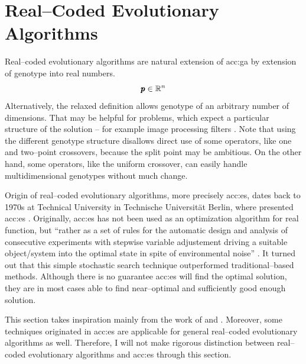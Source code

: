 \section{Real--Coded Evolutionary Algorithms}

Real--coded evolutionary algorithms are natural extension of \acrshort{acc:ga} by extension of genotype into real numbers.
$$
\pmb{p} \in \mathbb{R}^{n}
$$
Alternatively, the relaxed definition allows genotype of an arbitrary number of dimensions. That may be helpful for problems, which expect a particular structure of the solution -- for example image processing filters \citep{WVDF}. Note that using the different genotype structure disallows direct use of some operators, like one and two--point crossovers, because the split point may be ambitious. On the other hand, some operators, like the uniform crossover, can easily handle multidimensional genotypes without much change.

Origin of real--coded evolutionary algorithms, more precisely \acrfull{acc:es}, dates back to 1970s at Technical University in Technische Universität Berlin, where \citeauthor*{ES-original} presented \acrshort{acc:es} \citep{ES-original}. Originally, \acrshort{acc:es} has not been used as an optimization algorithm for real function, but \enquote{rather as a set of rules for the automatic design and analysis of consecutive experiments with stepwise variable adjustement driving a suitable object/system into the optimal state in spite of environmental noise} \citep{EScomprehensiveintroduction}. It turned out that this simple stochastic search technique outperformed traditional--based methods. Although there is no guarantee \acrshort{acc:es} will find the optimal solution, they are in most cases able to find near--optimal and sufficiently good enough solution.

This section takes inspiration mainly from the work of \citet*{IntroductionToEA} and \citet*{EScomprehensiveintroduction}. Moreover, some techniques originated in \acrshort{acc:es} are applicable for general real--coded evolutionary algorithms as well. Therefore, I will not make rigorous distinction between real--coded evolutionary algorithms and \acrshort{acc:es} through this section.

